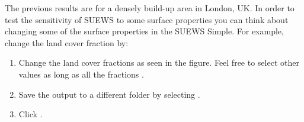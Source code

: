\documentclass[letterpaper,10pt,english]{sphinxmanual}
\begin{document}
The previous results are for a densely build-up area in
London, UK. In order to test the sensitivity of SUEWS to some surface
properties you can think about changing some of the surface properties
in the SUEWS Simple. For example, change the land cover fraction by:
\begin{enumerate}
\item {} 
Change the land cover fractions as seen in the figure. Feel free to
select other values as long as all the fractions .

\item {} 
Save the output to a different folder by selecting .

\item {} 
Click .

\end{enumerate}
\end{document}
